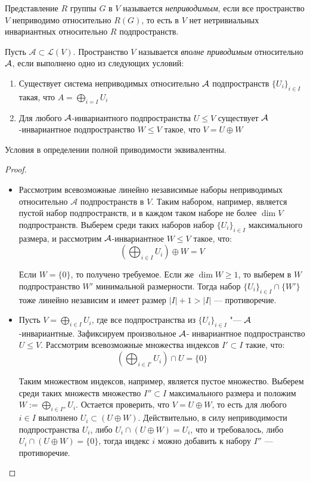 \begin{definition}
	Представление $R$ группы $G$ в $V$ называется \textit{неприводимым}, если все пространство $V$ неприводимо относительно $R(G)$, то есть в $V$ нет нетривиальных инвариантных относительно $R$ подпространств.
\end{definition}

\begin{definition}
	Пусть $\mathcal A \subset \mathcal{L}(V)$. Пространство $V$ называется \textit{вполне приводимым} относительно $\mathcal A$, если выполнено одно из следующих условий:
	\begin{enumerate}
		\item Существует система неприводимых относительно $\mathcal A$ подпространств $\{U_i\}_{i \in I}$ такая, что $A = \bigoplus_{i = I}U_i$
		\item Для любого $\mathcal A$-инвариантного подпространства $U \le V$ существует $\mathcal A$-инвариантное подпространство $W \le V$ такое, что $V = U \oplus W$
	\end{enumerate}
\end{definition}

\begin{theorem}
	Условия в определении полной приводимости эквивалентны.
\end{theorem}

\begin{proof}~
	\begin{itemize}
		\item{}Рассмотрим всевозможные линейно независимые наборы неприводимых относительно $\mathcal A$ подпространств в $V$. Таким набором, например, является пустой набор подпространств, и в каждом таком наборе не более $\dim{V}$ подпространств. Выберем среди таких наборов набор $\{U_i\}_{i \in I}$ максимального размера, и рассмотрим $\mathcal A$-инвариантное $W \le V$ такое, что:
		\[\left(\bigoplus_{i \in I}U_i\right) \oplus W = V\]
		
		Если $W = \{0\}$, то получено требуемое. Если же $\dim W \ge 1$, то выберем в $W$ подпространство $W'$ минимальной размерности. Тогда набор $\{U_i\}_{i \in I} \cap \{W'\}$ тоже линейно независим и имеет размер $|I| + 1  > |I|$ --- противоречие.
		
		\item{}Пусть $V = \bigoplus_{i \in I}U_i$, где все подпространства из $\{U_i\}_{i \in I}$ "--- $\mathcal A$-инвариантные. Зафиксируем произвольное $\mathcal A$- инвариантное подпространство $U \le V$. Рассмотрим всевозможные множества индексов $I' \subset I$ такие, что:
		\[\left(\bigoplus_{i \in I'}U_i\right) \cap U = \{0\}\]
		
		Таким множеством индексов, например, является пустое множество. Выберем среди таких множеств множество $I'' \subset I$ максимального размера и положим $W := \bigoplus_{i \in I''}U_i$. Остается проверить, что $V = U \oplus W$, то есть для любого $i \in I$ выполнено $U_i \subset (U \oplus W)$. Действительно, в силу неприводимости подпространства $U_i$, либо $U_i \cap (U \oplus W) = U_i$, что и требовалось, либо $U_i \cap (U \oplus W) = \{0\}$, тогда индекс $i$ можно добавить к набору $I''$ --- противоречие.\qedhere
	\end{itemize}
\end{proof}

